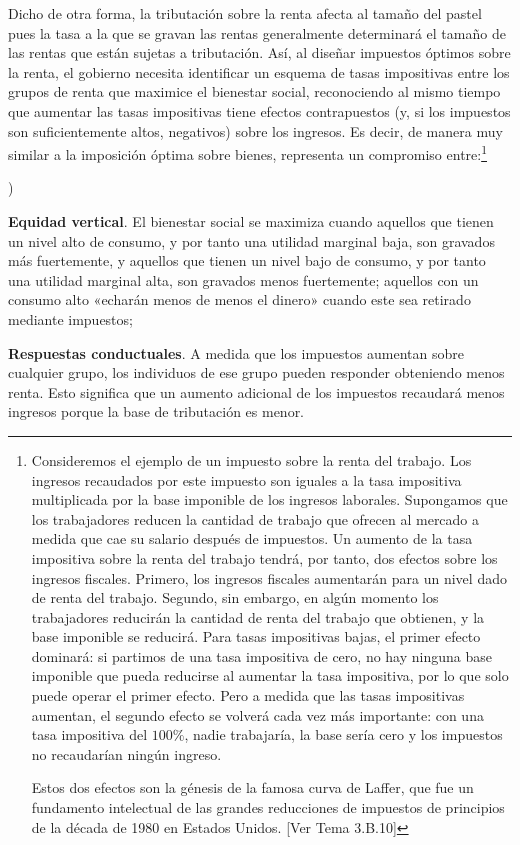 \documentclass[10pt,a4paper]{article}
\newcounter{alphaitem}
\newenvironment{la}
      {\begin{list}{\alph{alphaitem})}{%
          \usecounter{alphaitem}%
          \setlength{\leftmargin}{1cm}%
          \setlength{\parskip}{3pt}%
          \setlength{\itemsep}{0pt}%
          \setlength{\parsep}{0pt}%
      }}
      {\end{list}}
\newcommand{\authorfont}[1]{{\fontfamily{EBGaramond-TLF}\selectfont #1}}
\begin{document}
Dicho de otra forma, la tributación sobre la renta afecta al tamaño del pastel pues la tasa a la que se gravan las rentas generalmente determinará el tamaño de las rentas que están sujetas a tributación. Así, al diseñar impuestos óptimos sobre la renta, el gobierno necesita identificar un esquema de tasas impositivas entre los grupos de renta que maximice el bienestar social, reconociendo al mismo tiempo que aumentar las tasas impositivas tiene efectos contrapuestos (y, si los impuestos son suficientemente altos, negativos) sobre los ingresos. Es decir, de manera muy similar a la imposición óptima sobre bienes, representa un compromiso entre:\footnote{%
    Consideremos el ejemplo de un impuesto sobre la renta del trabajo. Los ingresos recaudados por este impuesto son iguales a la tasa impositiva multiplicada por la base imponible de los ingresos laborales. Supongamos que los trabajadores reducen la cantidad de trabajo que ofrecen al mercado a medida que cae su salario después de impuestos. Un aumento de la tasa impositiva sobre la renta del trabajo tendrá, por tanto, dos efectos sobre los ingresos fiscales. Primero, los ingresos fiscales aumentarán para un nivel dado de renta del trabajo. Segundo, sin embargo, en algún momento los trabajadores reducirán la cantidad de renta del trabajo que obtienen, y la base imponible se reducirá. Para tasas impositivas bajas, el primer efecto dominará: si partimos de una tasa impositiva de cero, no hay ninguna base imponible que pueda reducirse al aumentar la tasa impositiva, por lo que solo puede operar el primer efecto. Pero a medida que las tasas impositivas aumentan, el segundo efecto se volverá cada vez más importante: con una tasa impositiva del $100\%$, nadie trabajaría, la base sería cero y los impuestos no recaudarían ningún ingreso.
    
Estos dos efectos son la génesis de la famosa curva de Laffer, que fue un fundamento intelectual de las grandes reducciones de impuestos de principios de la década de 1980 en Estados Unidos. [\authorfont{Ver Tema 3.B.10}]
}
\begin{la}
    \item \textbf{Equidad vertical}. El bienestar social se maximiza cuando aquellos que tienen un nivel alto de consumo, y por tanto una utilidad marginal baja, son gravados más fuertemente, y aquellos que tienen un nivel bajo de consumo, y por tanto una utilidad marginal alta, son gravados menos fuertemente; aquellos con un consumo alto «echarán menos de menos el dinero» cuando este sea retirado mediante impuestos;
    \item \textbf{Respuestas conductuales}. A medida que los impuestos aumentan sobre cualquier grupo, los individuos de ese grupo pueden responder obteniendo menos renta. Esto significa que un aumento adicional de los impuestos recaudará menos ingresos porque la base de tributación es menor.
\end{la}
\end{document}
